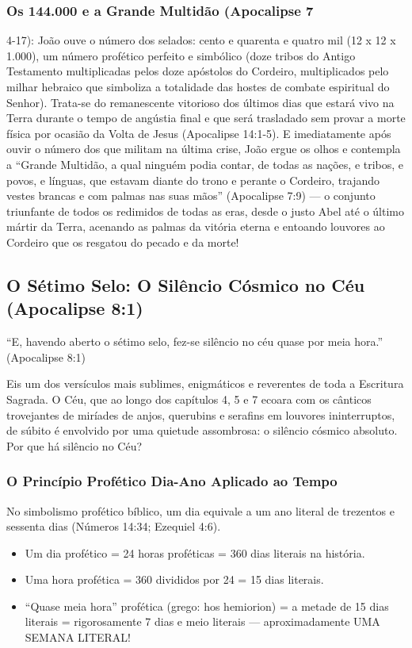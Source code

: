 \documentclass[11pt,a4paper,openany]{book}
\begin{document}
\subsubsection*{Os 144.000 e a Grande Multidão (Apocalipse 7}
4-17):
João ouve o número dos selados: cento e quarenta e quatro mil (12 x 12 x 1.000), um número profético perfeito e simbólico (doze tribos do Antigo Testamento multiplicadas pelos doze apóstolos do Cordeiro, multiplicados pelo milhar hebraico que simboliza a totalidade das hostes de combate espiritual do Senhor). Trata-se do remanescente vitorioso dos últimos dias que estará vivo na Terra durante o tempo de angústia final e que será trasladado sem provar a morte física por ocasião da Volta de Jesus (Apocalipse 14:1-5).
E imediatamente após ouvir o número dos que militam na última crise, João ergue os olhos e contempla a ``Grande Multidão, a qual ninguém podia contar, de todas as nações, e tribos, e povos, e línguas, que estavam diante do trono e perante o Cordeiro, trajando vestes brancas e com palmas nas suas mãos'' (Apocalipse 7:9) — o conjunto triunfante de todos os redimidos de todas as eras, desde o justo Abel até o último mártir da Terra, acenando as palmas da vitória eterna e entoando louvores ao Cordeiro que os resgatou do pecado e da morte!



\subsection{O Sétimo Selo: O Silêncio Cósmico no Céu (Apocalipse 8:1)}


``E, havendo aberto o sétimo selo, fez-se silêncio no céu quase por meia hora.'' (Apocalipse 8:1)

Eis um dos versículos mais sublimes, enigmáticos e reverentes de toda a Escritura Sagrada. O Céu, que ao longo dos capítulos 4, 5 e 7 ecoara com os cânticos trovejantes de miríades de anjos, querubins e serafins em louvores ininterruptos, de súbito é envolvido por uma quietude assombrosa: o silêncio cósmico absoluto.
Por que há silêncio no Céu?


\subsubsection*{O Princípio Profético Dia-Ano Aplicado ao Tempo}
No simbolismo profético bíblico, um dia equivale a um ano literal de trezentos e sessenta dias (Números 14:34; Ezequiel 4:6).
\begin{itemize}
  \item Um dia profético = 24 horas proféticas = 360 dias literais na história.
  \item Uma hora profética = 360 divididos por 24 = 15 dias literais.
  \item ``Quase meia hora'' profética (grego: hos hemiorion) = a metade de 15 dias literais = rigorosamente 7 dias e meio literais — aproximadamente UMA SEMANA LITERAL!
\end{itemize}
\end{document}
